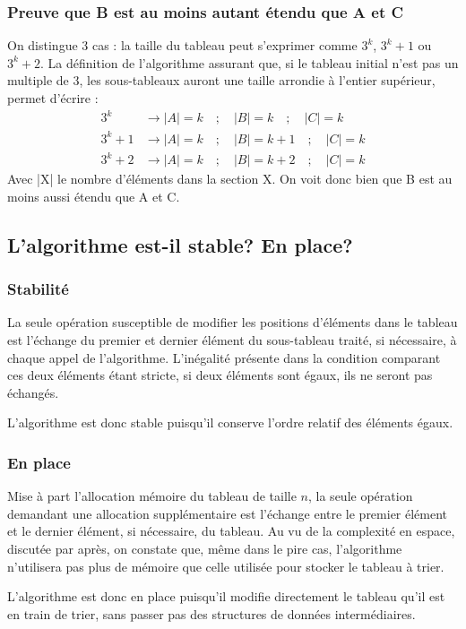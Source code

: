 \documentclass[a4paper, 12pt]{article}
\begin{document}
	\subsubsection*{Preuve que B est au moins autant étendu que A et C}
	On distingue 3 cas : la taille du tableau peut s'exprimer comme $3^k$, $3^k + 1$ ou $3^k + 2$. La définition de l'algorithme assurant que, si le tableau initial n'est pas un multiple de 3, les sous-tableaux auront une taille arrondie à l'entier supérieur, permet d'écrire : 
	\begin{align*}
	    3^k &\rightarrow |A| = k \quad; \quad |B| = k  \quad; \quad |C| = k \\
	    3^k + 1 &\rightarrow |A| = k  \quad;  \quad |B| = k + 1  \quad; \quad |C| = k \\
	    3^k + 2 &\rightarrow |A| = k  \quad; \quad |B| = k + 2  \quad; \quad |C| = k
	\end{align*}
	Avec |X| le nombre d'éléments dans la section X. On voit donc bien que B est au moins aussi étendu que A et C.
	\subsection{L'algorithme est-il stable? En place?}
	\subsubsection*{Stabilité}
	La seule opération susceptible de modifier les positions d'éléments dans le tableau est l'échange du premier et dernier élément du sous-tableau traité, si nécessaire, à chaque appel de l'algorithme. L'inégalité présente dans la condition comparant ces deux éléments étant stricte, si deux éléments sont égaux, ils ne seront pas échangés.\par
	L'algorithme est donc stable puisqu'il conserve l'ordre relatif des éléments égaux.
	\subsubsection*{En place}
	Mise à part l'allocation mémoire du tableau de taille \(n\), la seule opération demandant une allocation supplémentaire est l'échange entre le premier élément et le dernier élément, si nécessaire, du tableau. Au vu de la complexité en espace, discutée par après, on constate que, même dans le pire cas, l'algorithme n'utilisera pas plus de mémoire que celle utilisée pour stocker le tableau à trier.\par
	L'algorithme est donc en place puisqu'il modifie directement le tableau qu'il est en train de trier, sans passer pas des structures de données intermédiaires.
\end{document}
